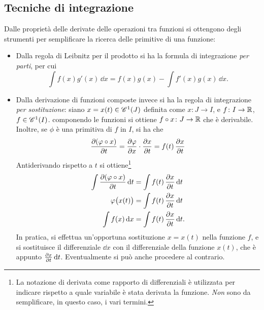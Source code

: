 \subsection*{Tecniche di integrazione}
Dalle proprietà delle derivate delle operazioni tra funzioni si ottengono degli strumenti per semplificare la ricerca delle primitive di una funzione:
\begin{itemize}
\item Dalla regola di Leibnitz per il prodotto si ha la formula di integrazione \emph{per parti}, per cui
\[
\int f(x)g'(x)\,\dd x=f(x)g(x)-\int f'(x)g(x)\,\dd x.
\]
\item Dalla derivazione di funzioni composte invece si ha la regola di integrazione \emph{per sostituzione}: siano $x=x(t)\in\cont[1]{J}$ definita come $x\colon J\to I$, e $f\colon I\to\R$, $f\in\cont[1]{I}$. componendo le funzioni si ottiene $f\circ x\colon J\to\R$ che è derivabile. Inoltre, se $\phi$ è una primitiva di $f$ in $I$, si ha che
\[
\drp{(\phi\circ x)}{t}=\drp{\phi}{x}\cdot\drp{x}{t}=f(t)\,\drp{x}{t}
\]
Antiderivando rispetto a $t$ si ottiene\footnote{La notazione di derivata come rapporto di differenziali è utilizzata per indicare rispetto a quale variabile è stata derivata la funzione. \emph{Non} sono da semplificare, in questo caso, i vari termini.}
\begin{align*}
\int\drp{(\phi\circ x)}{t}\,\dd t&=\int f(t)\,\drp{x}{t}\,\dd t\\
\phi\big(x(t)\big)&=\int f(t)\,\drp{x}{t}\,\dd t\\
\int f(x)\,\dd x&=\int f(t)\,\drp{x}{t}\,\dd t.
\end{align*}
In pratica, si effettua un'opportuna sostituzione $x=x(t)$ nella funzione $f$, e si sostituisce il differenziale $\dd x$ con il differenziale della funzione $x(t)$, che è appunto $\drp{x}{t}\,\dd t$. Eventualmente si può anche procedere al contrario.
\end{itemize}

